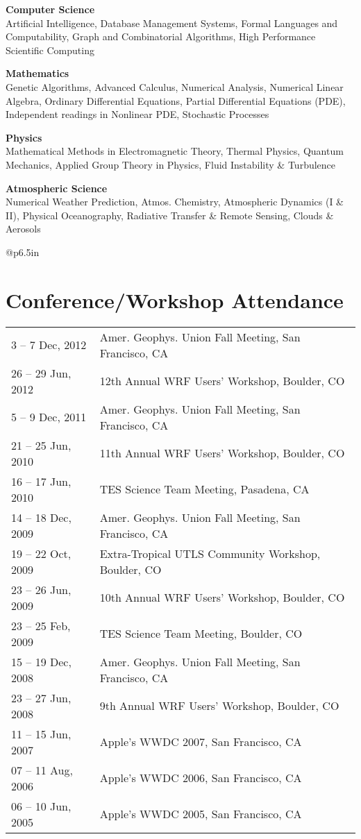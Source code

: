 \documentclass[overlap,12pt,centered]{res}
\makeatletter
\newcommand{\tabulated}{\begin{tabular}{@{}p{1.4in}p{4.9in}}}
\newcommand{\block}{\begin{tabular}{@{}p{6.5in}}}
\makeatother
\begin{document}
\begin{resume}
		{\bf Computer Science} \\
		Artificial Intelligence, Database Management Systems, Formal Languages and Computability, Graph and Combinatorial Algorithms, High Performance Scientific Computing
		
		{\bf Mathematics} \\
		Genetic Algorithms, Advanced Calculus, Numerical Analysis, Numerical Linear Algebra, Ordinary Differential Equations, Partial Differential Equations (PDE), Independent readings in Nonlinear PDE, Stochastic Processes
		
		{\bf Physics} \\
		Mathematical Methods in Electromagnetic Theory, Thermal Physics, Quantum Mechanics, Applied Group Theory in Physics, Fluid Instability \& Turbulence
		
		{\bf Atmospheric Science} \\
		Numerical Weather Prediction, Atmos. Chemistry, Atmospheric Dynamics (I \& II), Physical Oceanography, Radiative Transfer \& Remote Sensing, Clouds \& Aerosols
		
		\block
		\section{\sc Conference/Workshop Attendance}
		\tabulated
			3 -- 7 Dec, 2012	&	{ Amer. Geophys. Union Fall Meeting, San Francisco, CA } \\
			26 -- 29 Jun, 2012	&	{ 12th Annual WRF Users' Workshop, Boulder, CO  } \\
			5 -- 9 Dec, 2011	&	{ Amer. Geophys. Union Fall Meeting, San Francisco, CA } \\
			21 -- 25 Jun, 2010	&   	{ 11th Annual WRF Users' Workshop, Boulder, CO } \\
			16 -- 17 Jun, 2010	&  	{ TES Science Team Meeting, Pasadena, CA } \\
			14 -- 18 Dec, 2009	&	{ Amer. Geophys. Union Fall Meeting, San Francisco, CA } \\
			19 -- 22 Oct, 2009	&	{ Extra-Tropical UTLS Community Workshop, Boulder, CO } \\
			23 -- 26 Jun, 2009	&	{ 10th Annual WRF Users' Workshop, Boulder, CO }  \\
			23 -- 25 Feb, 2009	&	{ TES Science Team Meeting, Boulder, CO} \\
			15 -- 19 Dec, 2008	&   	{ Amer. Geophys. Union Fall Meeting, San Francisco, CA } \\
			23 -- 27 Jun, 2008	&	{ 9th Annual WRF Users' Workshop, Boulder, CO }  \\
			11 -- 15 Jun, 2007	&	{ Apple's WWDC 2007, San Francisco, CA } \\
			07 -- 11 Aug, 2006	&	{ Apple's WWDC 2006, San Francisco, CA } \\
			06 -- 10 Jun, 2005	&	{ Apple's WWDC 2005, San Francisco, CA }
		\end{tabular}
		\end{tabular}


\end{resume}
\end{document}

